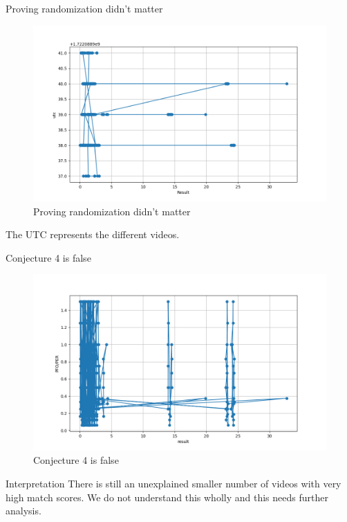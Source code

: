 \documentclass[]{beamer}
\theoremstyle{remark}
\begin{document}
\begin{frame}{Proving randomization didn't matter}
	\begin{figure}[h]
		\centering
		\includegraphics[width=\textwidth]{QueryScaleOfMatch.png}
		\caption{Proving randomization didn't matter}
		\label{graphs:random}
	\end{figure}
	The UTC represents the different videos.
\end{frame}


\begin{frame}{Conjecture 4 is false}
	\begin{figure}[h]
		\centering
		\includegraphics[width=\textwidth]{QueryRatio.png}
		\caption{Conjecture 4 is false}
		\label{graphs:conj4}
	\end{figure}
\end{frame}


\begin{frame}{Interpretation}
There is still an unexplained smaller number of videos with very high match scores. We do not understand this wholly and this needs further analysis. 
\end{frame}
\end{document}
